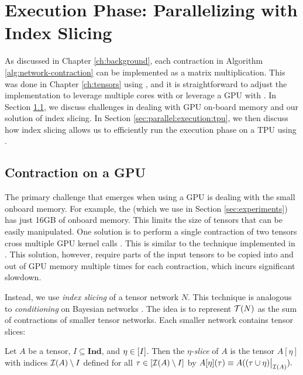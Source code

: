 \section{Execution Phase: Parallelizing with Index Slicing}
\label{sec:parallel:execution}
As discussed in Chapter \ref{ch:background}, each contraction in Algorithm \ref{alg:network-contraction} can be implemented as a matrix multiplication.
This was done in Chapter \ref{ch:tensors} using  \cite{numpy}, and it is straightforward to adjust the implementation to leverage multiple cores with  or leverage a GPU with  \cite{ABCCDDDGII16}. 
In Section \ref{sec:parallel:execution:gpu}, we discuss challenges in dealing with GPU on-board memory and our solution of index slicing. In Section \ref{sec:parallel:execution:tpu}, we then discuss how index slicing allows us to efficiently run the execution phase on a TPU using  \cite{jax2018github}.

\subsection{Contraction on a GPU}
\label{sec:parallel:execution:gpu}
The primary challenge that emerges when using a GPU is dealing with the small onboard memory. For example, the  (which we use in Section \ref{sec:experiments}) has just 16GB of onboard memory. This limits the size of tensors that can be easily manipulated. One solution is to perform a single contraction of two tensors cross multiple GPU kernel calls \cite{RRBSKH08}. This is similar to the technique implemented in  \cite{FHZ19}. This solution, however, require parts of the input tensors to be copied into and out of GPU memory multiple times for each contraction, which incurs significant slowdown.

Instead, we use \emph{index slicing} \cite{CZHNS18,GK20,VBNHRBM19} of a tensor network $N$. This technique is analogous to \emph{conditioning} on Bayesian networks \cite{darwiche01,dechter99,pearl86,SAS94}. The idea is to represent $\mathcal{T}(N)$ as the sum of contractions of smaller tensor networks. Each smaller network contains tensor slices:

\begin{definition}
Let $A$ be a tensor, $I \subseteq \textbf{Ind}$, and $\eta \in [I]$. Then the \emph{$\eta$-slice} of $A$ is the tensor $A[\eta]$ with indices $\mathcal{I}(A) \setminus I$ defined for all $\tau \in [\mathcal{I}(A) \setminus I]$ by $A[\eta](\tau) \equiv A((\tau \cup \eta)\big|_{\mathcal{I}(A)}).$
\end{definition}

